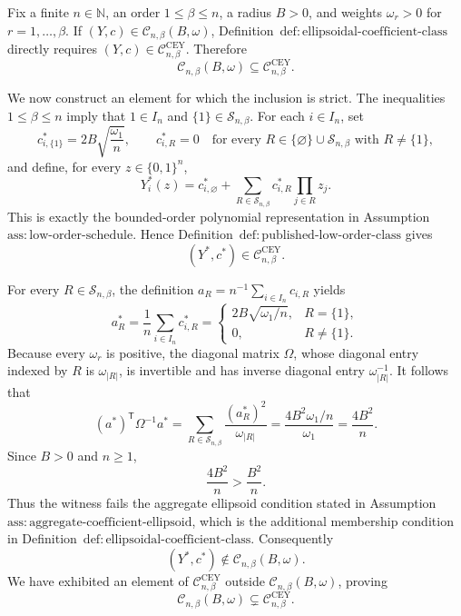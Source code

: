 Fix a finite \(n\in\mathbb N\), an order \(1\leq\beta\leq n\), a radius \(B>0\), and weights \(\omega_r>0\) for \(r=1,\ldots,\beta\).  If \((Y,c)\in\mathcal C_{n,\beta}(B,\omega)\), Definition~\(\mathrm{def{:}ellipsoidal\text{-}coefficient\text{-}class}\) directly requires \((Y,c)\in\mathcal C^{\mathrm{CEY}}_{n,\beta}\).  Therefore
\[
\mathcal C_{n,\beta}(B,\omega)
\subseteq
\mathcal C^{\mathrm{CEY}}_{n,\beta}.
\]

We now construct an element for which the inclusion is strict.  The inequalities \(1\leq\beta\leq n\) imply that \(1\in I_n\) and \(\{1\}\in\mathcal S_{n,\beta}\).  For each \(i\in I_n\), set
\[
c^*_{i,\{1\}}=2B\sqrt{\frac{\omega_1}{n}},
\qquad
c^*_{i,R}=0
\quad
\text{for every }R\in\{\varnothing\}\cup\mathcal S_{n,\beta}
\text{ with }R\neq\{1\},
\]
and define, for every \(z\in\{0,1\}^n\),
\[
Y_i^*(z)
=c^*_{i,\varnothing}
+\sum_{R\in\mathcal S_{n,\beta}}c^*_{i,R}
  \prod_{j\in R}z_j.
\]
This is exactly the bounded-order polynomial representation in Assumption~\(\mathrm{ass{:}low\text{-}order\text{-}schedule}\).  Hence Definition~\(\mathrm{def{:}published\text{-}low\text{-}order\text{-}class}\) gives
\[
(Y^*,c^*)\in\mathcal C^{\mathrm{CEY}}_{n,\beta}.
\]

For every \(R\in\mathcal S_{n,\beta}\), the definition \(a_R=n^{-1}\sum_{i\in I_n}c_{i,R}\) yields
\[
a_R^*
=\frac{1}{n}\sum_{i\in I_n}c^*_{i,R}
=
\begin{cases}
2B\sqrt{\omega_1/n},&R=\{1\},\\
0,&R\neq\{1\}.
\end{cases}
\]
Because every \(\omega_r\) is positive, the diagonal matrix \(\Omega\), whose diagonal entry indexed by \(R\) is \(\omega_{|R|}\), is invertible and has inverse diagonal entry \(\omega_{|R|}^{-1}\).  It follows that
\[
(a^*)^{\mathsf T}\Omega^{-1}a^*
=\sum_{R\in\mathcal S_{n,\beta}}
  \frac{(a_R^*)^2}{\omega_{|R|}}
=\frac{4B^2\omega_1/n}{\omega_1}
=\frac{4B^2}{n}.
\]
Since \(B>0\) and \(n\geq1\),
\[
\frac{4B^2}{n}>\frac{B^2}{n}.
\]
Thus the witness fails the aggregate ellipsoid condition stated in Assumption~\(\mathrm{ass{:}aggregate\text{-}coefficient\text{-}ellipsoid}\), which is the additional membership condition in Definition~\(\mathrm{def{:}ellipsoidal\text{-}coefficient\text{-}class}\).  Consequently
\[
(Y^*,c^*)\notin\mathcal C_{n,\beta}(B,\omega).
\]
We have exhibited an element of \(\mathcal C^{\mathrm{CEY}}_{n,\beta}\) outside \(\mathcal C_{n,\beta}(B,\omega)\), proving
\[
\mathcal C_{n,\beta}(B,\omega)
\subsetneq
\mathcal C^{\mathrm{CEY}}_{n,\beta}.
\]